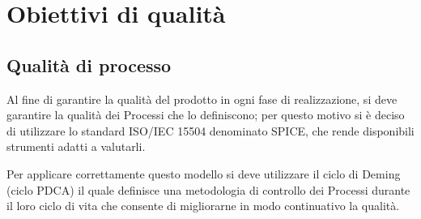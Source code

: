 \section{Obiettivi di qualità} 
\subsection{Qualità di processo}

Al fine di garantire la qualità del prodotto in ogni fase di realizzazione, si deve garantire la qualità dei Processi che lo definiscono; per questo motivo si è deciso di utilizzare lo standard ISO/IEC 15504 denominato SPICE, che rende disponibili strumenti adatti a valutarli.

Per applicare correttamente questo modello si deve utilizzare il ciclo di Deming (ciclo PDCA) il quale definisce una metodologia di controllo dei Processi durante il loro ciclo di vita che consente di migliorarne in modo continuativo la qualità.

